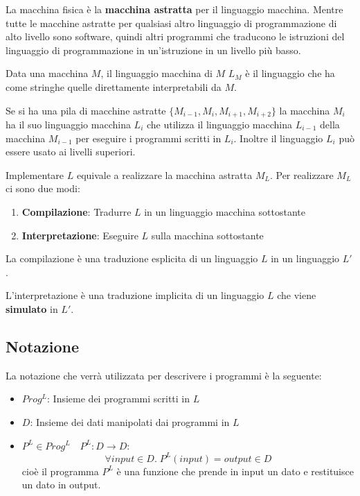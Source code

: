 \documentclass[a4paper]{article}
\begin{document}
\begin{example}
  La macchina fisica è la \textbf{macchina astratta} per il linguaggio macchina.
  Mentre tutte le macchine astratte per qualsiasi altro linguaggio di programmazione
  di alto livello
  sono software, quindi altri programmi che traducono le istruzioni del linguaggio di programmazione
  in un'istruzione in un livello più basso.
\end{example}

\begin{definition}
  Data una macchina \( M \), il linguaggio macchina di \( M \) \( L_M \) è il linguaggio
  che ha come stringhe quelle direttamente interpretabili da \( M \).

  \vspace{1em}
  \noindent
  Se si ha una pila di macchine astratte \( \{M_{i-1}, M_i, M_{i+1}, M_{i+2}\} \)
  la macchina \( M_i \) ha il suo linguaggio macchina \( L_{i} \) che utilizza il
  linguaggio macchina \( L_{i-1} \) della macchina \( M_{i-1} \) per eseguire i
  programmi scritti in \( L_i \). Inoltre il linguaggio \( L_i \) può essere usato
  ai livelli superiori.

\end{definition}
\noindent
Implementare \( L \) equivale a realizzare la macchina astratta \( M_L \). Per realizzare
\( M_L \) ci sono due modi:
\begin{enumerate}
  \item \label{item:compilazione}
    \textbf{Compilazione}: Tradurre \( L \) in un linguaggio macchina sottostante
  \item \label{item:interpretazione}
    \textbf{Interpretazione}: Eseguire \( L \) sulla macchina sottostante
\end{enumerate}

\begin{definition}[Compilazione]
  La compilazione è una traduzione esplicita di un linguaggio \( L \) in un linguaggio
  \( L' \).
\end{definition}

\begin{definition}[Interpretazione]
  L'interpretazione è una traduzione implicita di un linguaggio \( L \) che viene
  \textbf{simulato} in \( L' \).
\end{definition}

\subsection{Notazione}
La notazione che verrà utilizzata per descrivere i programmi è la seguente:
\begin{itemize}
  \item \( Prog^L \): Insieme dei programmi scritti in \( L \)
  \item \( D \): Insieme dei dati manipolati dai programmi in \( L \) 
  \item \( P^L \in Prog^L \quad P^L: D \to D \):
    \[
      \forall input \in D.\; P^L(input) = output \in D
    \] 
    cioè il programma \( P^L \) è una funzione che prende in input un dato e restituisce
    un dato in output.
\end{itemize}
\end{document}
